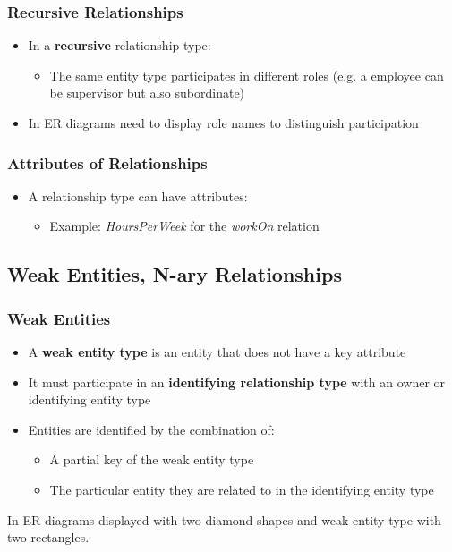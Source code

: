 \subsubsection{Recursive Relationships}

\begin{itemize}[label=\(\rhd\)]
    \item In a \textbf{recursive} relationship type:
    \begin{itemize}[label=\(\rhd\)]
        \item The same entity type participates in different roles (e.g. a employee can be supervisor but also subordinate)
    \end{itemize}
    \item In ER diagrams need to display role names to distinguish participation
\end{itemize}
\subsubsection{Attributes of Relationships}
\begin{itemize}[label=\(\rhd\)]
    \item A relationship type can have attributes: 
    \begin{itemize}[label=\(\rhd\)]
        \item Example: \textit{HoursPerWeek} for the \textit{workOn} relation
    \end{itemize}
\end{itemize}


\subsection{Weak Entities, N-ary Relationships}
\subsubsection{Weak Entities}
\begin{itemize}[label=\(\rhd\)]
    \item A \textbf{weak entity type} is an entity that does not have a key attribute
    \item It must participate in an \textbf{identifying relationship type} with an owner or identifying entity type
    \item Entities are identified by the combination of:
    \begin{itemize}[label=\(\rhd\)]
        \item A partial key of the weak entity type
        \item The particular entity they are related to in the identifying entity type
    \end{itemize}
\end{itemize}
In ER diagrams displayed with two diamond-shapes and weak entity type with two rectangles.

